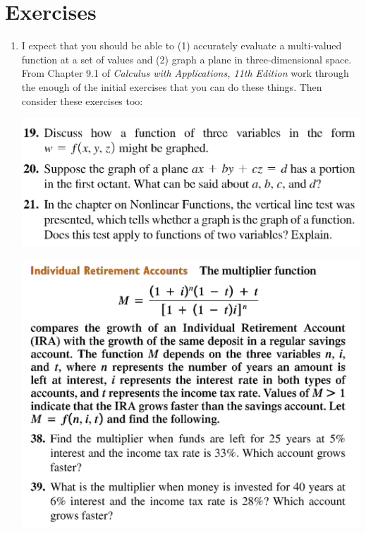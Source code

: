 \newpage

\section*{Exercises}

\begin{enumerate}
    \item %
        I expect that you should be able to (1) accurately 
        evaluate a multi-valued function at a set of values and 
        (2) graph a plane in three-dimensional space.
        From Chapter 9.1 of \emph{Calculus with Applications, 11th Edition}
        work through the enough of the initial exercises 
        that you can do these things.
        Then consider these exercises too:
        \begin{center}
            \includegraphics[width=.83\textwidth]{screenshots/192021.png}
        \end{center}
        \begin{center}
            \includegraphics[width=.83\textwidth]{screenshots/3839.png}
        \end{center}


\end{enumerate}
